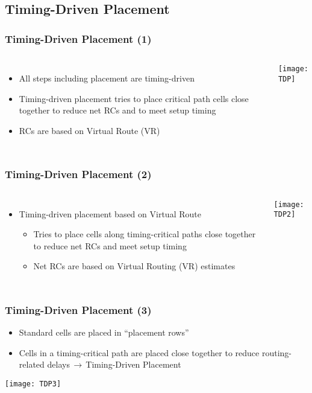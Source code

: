 \documentclass[compress]{beamer}
\begin{document}
	\subsection[Timing]{Timing-Driven Placement}
	\begin{frame}
		\frametitle{Timing-Driven Placement (1)}
		\begin{columns}	
		\begin{itemize}
			\item All steps including placement are timing-driven
			
			\item Timing-driven placement tries to place critical path cells close together to reduce net  RCs and to meet setup timing
			\item RCs are based on Virtual Route (VR)
			
		\end{itemize}
	\begin{center}
		\texttt{[image: TDP]}
	\end{center}
\end{columns}
	\end{frame}
\begin{frame}
	\frametitle{Timing-Driven Placement (2)}
	\begin{columns}	
		\column{0.5\textwidth}
		\begin{itemize}
			\item Timing-driven placement based on Virtual Route
			
			\begin{itemize}
			\item Tries to place cells along timing-critical paths close together to reduce net RCs and meet setup timing
			
			\item Net RCs are based on Virtual Routing (VR) estimates
			
			\end{itemize}
			
		\end{itemize}
		\column{0.5\textwidth}
		\begin{center}
			\texttt{[image: TDP2]}
		\end{center}
	\end{columns}
\end{frame}

\begin{frame}
	\frametitle{Timing-Driven Placement (3)}
	\begin{itemize}
		\item Standard cells are placed in “placement rows”
		\item Cells in a timing-critical path are placed close together to reduce routing-related delays$\,\to\,$Timing-Driven Placement
		
	\end{itemize}
	\begin{center}
		\texttt{[image: TDP3]}
	\end{center}
\end{frame}
\end{document}
